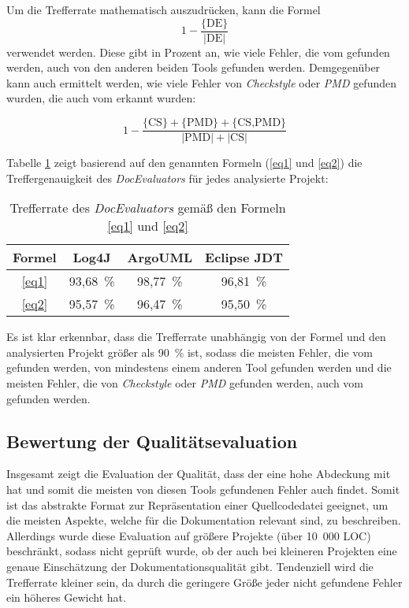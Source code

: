 Um die Trefferrate mathematisch auszudrücken, kann die Formel
\begin{equation}\label{eq1}
    1-\frac{\text{\{DE\}}}{|\text{DE}|}
\end{equation} verwendet werden. Diese gibt in Prozent an, wie viele Fehler, die vom \doceval gefunden werden, auch von den anderen beiden Tools gefunden werden. Demgegenüber kann auch ermittelt werden, wie viele Fehler von \textit{Checkstyle} oder \textit{PMD} gefunden wurden, die auch vom \doceval erkannt wurden:

\begin{equation}\label{eq2}
    1-\frac{\text{\{CS\}}+\text{\{PMD\}}+\text{\{CS,PMD\}}}{|\text{PMD}|+|\text{CS}|}
\end{equation}

Tabelle \ref{tab:hit_rate} zeigt basierend auf den genannten Formeln (\ref{eq1} und \ref{eq2}) die Treffergenauigkeit des \textit{DocEvaluators} für jedes analysierte Projekt:
\begin{table}[]
    \centering
    \begin{tabular}{c|c|c|c}
    Formel & Log4J & ArgoUML & Eclipse \ac{JDT} \\ \hline
    \ref{eq1} &   93,68~\% &	98,77~\% &	96,81~\% \\\hline
     \ref{eq2} & 95,57~\% &	96,47~\% &	95,50~\% \\\hline

    \end{tabular}
    \caption{Trefferrate des \textit{DocEvaluators} gemäß den Formeln \ref{eq1} und \ref{eq2}}
    \label{tab:hit_rate}
\end{table}
Es ist klar erkennbar, dass die Trefferrate unabhängig von der Formel und den analysierten Projekt größer als 90~\% ist, sodass die meisten Fehler, die vom \doceval gefunden werden, von mindestens einem anderen Tool gefunden werden und die meisten Fehler, die von \textit{Checkstyle} oder \textit{PMD} gefunden werden, auch vom \doceval gefunden werden.






\subsection{Bewertung der Qualitätsevaluation}
Insgesamt zeigt die Evaluation der Qualität, dass der \doceval eine hohe Abdeckung mit \checkpmd hat und somit die meisten von diesen Tools gefundenen Fehler auch findet. Somit ist das abstrakte Format zur Repräsentation einer Quellcodedatei geeignet, um die meisten Aspekte, welche für die Dokumentation relevant sind, zu beschreiben. Allerdings wurde diese Evaluation auf größere Projekte (über 10~000 \ac{LOC}) beschränkt, sodass nicht geprüft wurde, ob der \doceval auch bei kleineren Projekten eine genaue Einschätzung der Dokumentationsqualität gibt. Tendenziell wird die Trefferrate kleiner sein, da durch die geringere Größe jeder nicht gefundene Fehler ein höheres Gewicht hat. 

